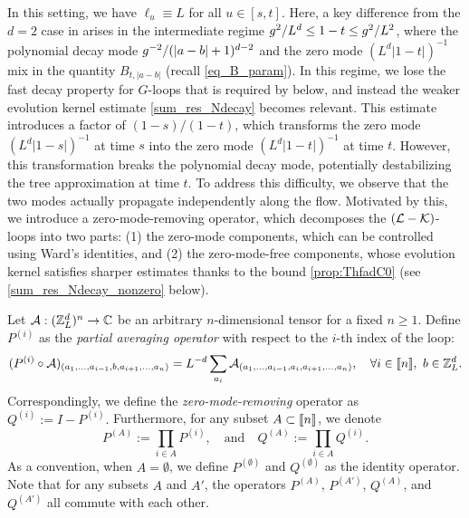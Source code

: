 In this setting, we have $\ell_u\equiv L$ for all $u\in[s,t]$. Here, a key difference from the $d = 2$ case in \cite{DYYY25} arises in the intermediate regime $g^2/L^{d} \leq 1 - t \leq g^2/L^{2}$, where the polynomial decay mode $g^{-2} / (|a - b| + 1)^{d - 2}$ and the zero mode $(L^d |1 - t|)^{-1}$ mix in the quantity $B_{t, |a - b|}$ (recall \eqref{eq_B_param}).
In this regime, we lose the fast decay property for $G$-loops that is required by  below, and instead the weaker evolution kernel estimate \eqref{sum_res_Ndecay} becomes relevant. This estimate introduces a factor of $(1 - s)/(1 - t)$, which transforms the zero mode $(L^d |1 - s|)^{-1}$ at time $s$ into the zero mode $(L^d |1 - t|)^{-1}$ at time $t$. However, this transformation breaks the polynomial decay mode, potentially destabilizing the tree approximation at time $t$.
To address this difficulty, we observe that the two modes actually propagate independently along the flow. Motivated by this, we introduce a zero-mode-removing operator, which decomposes the $(\mathcal L - \mathcal K)$-loops into two parts: (1) the zero-mode components, which can be controlled using Ward's identities, and (2) the zero-mode-free components, whose evolution kernel satisfies sharper estimates thanks to the bound \eqref{prop:ThfadC0} (see \eqref{sum_res_Ndecay_nonzero} below).



\begin{definition}\label{def;zero_mode_remove}
Let ${\mathcal A}: ({\mathbb Z}_L^d)^{n}\to \mathbb C$ be an arbitrary $n$-dimensional tensor for a fixed $n\ge 1$. Define $P^{(i)}$ as the \emph{partial averaging operator} with respect to the $i$-th index of the loop: 
$$
(P^{(i)}\circ {\mathcal A})_{(a_1,\ldots, a_{i-1},b,a_{i+1},\ldots,a_n)}=L^{-d} \sum_{a_i}{\mathcal A}_{(a_1,\ldots, a_{i-1},a_i,a_{i+1},\ldots,a_n)},\quad \forall i\in \llbracket{n}\rrbracket, \ b\in {\mathbb Z}_L^d.$$
Correspondingly, we define the \emph{zero-mode-removing} operator as $Q^{(i)}:= I-P^{(i)}.$ Furthermore, for any subset $A\subset \llbracket{n}\rrbracket$, we denote 
$$P^{(A)}:=\prod_{i\in A} P^{(i)},\quad \text{and}\quad  
Q^{(A)}:=\prod_{i\in A} Q^{(i)}.
$$
As a convention, when $A=\emptyset$, we define $P^{(\emptyset)}$ and $Q^{(\emptyset)}$ as the identity operator. 
Note that for any subsets $A$ and $A'$, the operators $P^{(A)}$, $P^{(A')}$, $Q^{(A)}$, and $Q^{(A')}$ all commute with each other. 

\end{definition}

